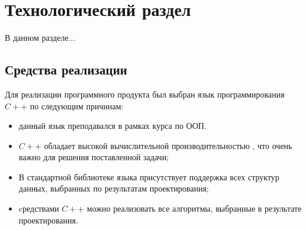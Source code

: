 \chapter{Технологический раздел}

В данном разделе...

\section{Средства реализации}

Для реализации программного продукта был выбран язык программирования $C++$ \cite{info_pl} по следующим причинам:

\begin{itemize}[label*=---]
	\item данный язык преподавался в рамках курса по ООП.
	\item $C++$ обладает высокой вычислительной производительностью \cite{info_cmpCplplPy, info_cmpCplplJava}, что очень важно для решения поставленной задачи;
	\item В стандартной библиотеке языка присутствует поддержка всех
	структур данных, выбранных по результатам проектирования;
	\item cредствами $C++$ можно реализовать все алгоритмы, выбранные в результате проектирования.
\end{itemize}